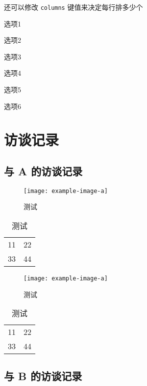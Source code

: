 还可以修改 \verb|columns| 键值来决定每行排多少个
\begin{choices}[
  columns = 3,            %
  label = (\arabic*)      %
]
  \item 选项1
  \item 选项2
  \item 选项3
  \item 选项4
  \item 选项5
  \item 选项6
\end{choices}



\chapter{访谈记录}


\section{与 A 的访谈记录}

\begin{figure}[htbp]
  \centering
  \texttt{[image: example-image-a]}
  \caption{测试}
  \label{figure:test2}
\end{figure}

\begin{table}[htbp]
  \centering
  \caption{测试}
  \label{table:test2}
  \begin{tabular}{|c|c|}
    11 & 22 \\
    33 & 44 
  \end{tabular}
\end{table}

\begin{figure}[htbp]
  \centering
  \texttt{[image: example-image-a]}
  \caption{测试}
  \label{figure:test3}
\end{figure}

\begin{table}[htbp]
  \centering
  \caption{测试}
  \label{table:test3}
  \begin{tabular}{|c|c|}
    11 & 22 \\
    33 & 44 
  \end{tabular}
\end{table}

\section{与 B 的访谈记录}